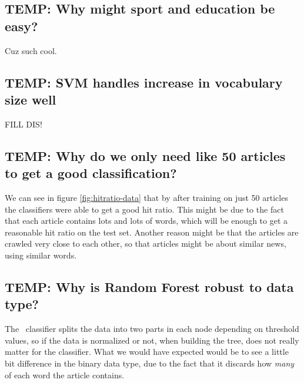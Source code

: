 \subsection{TEMP: Why might sport and education be easy?} %
\label{sub:temp_why_might_sport_and_education_be_easy_}
Cuz such cool.

\subsection{TEMP: SVM handles increase in vocabulary size well} %
\label{sub:temp_svm_handles_increase_in_vocabulary_size_well}
FILL DIS!

\subsection{TEMP: Why do we only need like 50 articles to get a good classification?} %
\label{sub:temp_why_do_we_only_need_like_50_articles_to_get_a_good_classification_}
We can see in figure \ref{fig:hitratio-data} that by after training on just 50 articles the classifiers were able to get a good hit ratio. This might be due to the fact that each article contains lots and lots of words, which will be enough to get a reasonable hit ratio on the test set. Another reason might be that the articles are crawled very close to each other, so that articles might be about similar news, using similar words.

\subsection{TEMP: Why is Random Forest robust to data type?} %
\label{sub:temp_why_is_random_forest_robust_to_data_type_}
The \rf\ classifier splits the data into two parts in each node depending on threshold values, so if the data is normalized or not, when building the tree, does not really matter for the classifier. What we would have expected would be to see a little bit difference in the binary data type, due to the fact that it discards how \emph{many} of each word the article contains.

